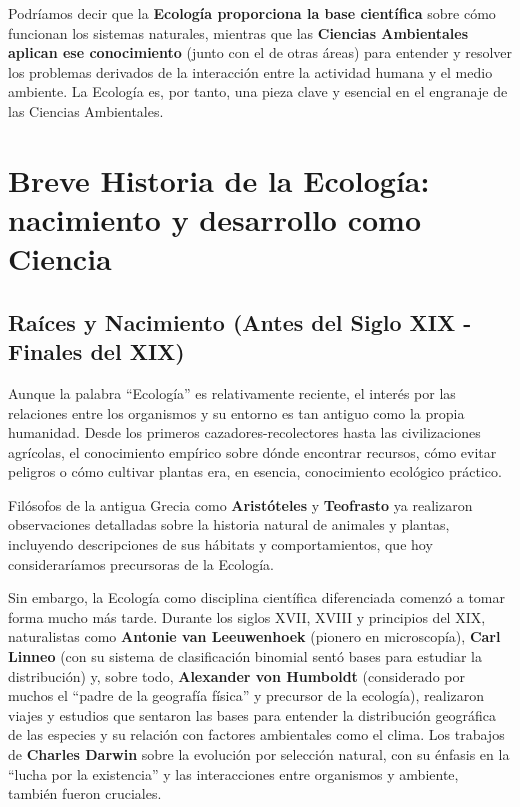 \documentclass[
]{book}
\begin{document}
Podríamos decir que la \textbf{Ecología proporciona la base científica} sobre cómo funcionan los sistemas naturales, mientras que las \textbf{Ciencias Ambientales aplican ese conocimiento} (junto con el de otras áreas) para entender y resolver los problemas derivados de la interacción entre la actividad humana y el medio ambiente. La Ecología es, por tanto, una pieza clave y esencial en el engranaje de las Ciencias Ambientales.

\section*{Breve Historia de la Ecología: nacimiento y desarrollo como Ciencia}\label{historia}

\subsection*{\texorpdfstring{\textbf{Raíces y Nacimiento (Antes del Siglo XIX - Finales del XIX)}}{Raíces y Nacimiento (Antes del Siglo XIX - Finales del XIX)}}\label{raices}

Aunque la palabra ``Ecología'' es relativamente reciente, el interés por las relaciones entre los organismos y su entorno es tan antiguo como la propia humanidad. Desde los primeros cazadores-recolectores hasta las civilizaciones agrícolas, el conocimiento empírico sobre dónde encontrar recursos, cómo evitar peligros o cómo cultivar plantas era, en esencia, conocimiento ecológico práctico.

Filósofos de la antigua Grecia como \textbf{Aristóteles} y \textbf{Teofrasto} ya realizaron observaciones detalladas sobre la historia natural de animales y plantas, incluyendo descripciones de sus hábitats y comportamientos, que hoy consideraríamos precursoras de la Ecología.

Sin embargo, la Ecología como disciplina científica diferenciada comenzó a tomar forma mucho más tarde. Durante los siglos XVII, XVIII y principios del XIX, naturalistas como \textbf{Antonie van Leeuwenhoek} (pionero en microscopía), \textbf{Carl Linneo} (con su sistema de clasificación binomial sentó bases para estudiar la distribución) y, sobre todo, \textbf{Alexander von Humboldt} (considerado por muchos el ``padre de la geografía física'' y precursor de la ecología), realizaron viajes y estudios que sentaron las bases para entender la distribución geográfica de las especies y su relación con factores ambientales como el clima. Los trabajos de \textbf{Charles Darwin} sobre la evolución por selección natural, con su énfasis en la ``lucha por la existencia'' y las interacciones entre organismos y ambiente, también fueron cruciales.
\end{document}
